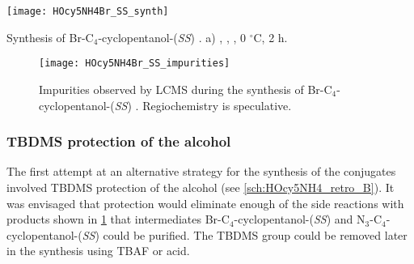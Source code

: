 \begin{scheme}[H]
	\begin{center}
		\texttt{[image: HOcy5NH4Br\_SS\_synth]}
		\caption{Synthesis of Br-C$_4$-cyclopentanol-(\textit{SS}) .
		a) , , , 0 $^{\circ}$C, 2 h. \label{sch:HOcy5NH4Br_SS_synth}}
	\end{center}
\end{scheme}

\begin{figure}[H]
	\begin{center}
		\texttt{[image: HOcy5NH4Br\_SS\_impurities]}
		\caption{Impurities observed by LCMS during the synthesis of Br-C$_4$-cyclopentanol-(\textit{SS}) .
		Regiochemistry is speculative.
		\label{fig:HOcy5NH4Br_SS_impurities}}
	\end{center}
\end{figure}

\subsubsection{TBDMS protection of the alcohol \label{sec:TBDMS}}


The first attempt at an alternative strategy for the synthesis of the conjugates involved TBDMS protection of the alcohol (see \ref{sch:HOcy5NH4_retro_B}). It was envisaged that protection would eliminate enough of the side reactions with products shown in \ref{fig:HOcy5NH4Br_SS_impurities} that intermediates Br-C$_4$-cyclopentanol-(\textit{SS})  and N$_3$-C$_4$-cyclopentanol-(\textit{SS})  could be purified. The TBDMS group could be removed later in the synthesis using TBAF or acid.

